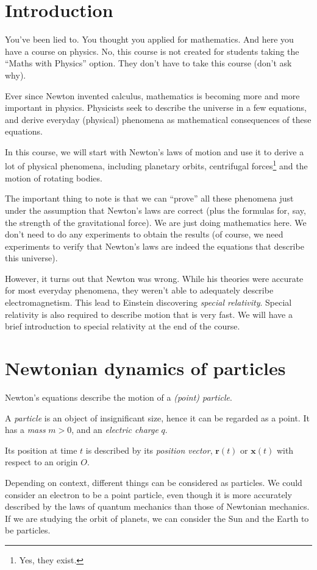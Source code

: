 \documentclass[a4paper]{article}
\begin{document}
\tableofcontents
\setcounter{section}{-1}
\section{Introduction}
You've been lied to. You thought you applied for mathematics. And here you have a course on physics. No, this course is not created for students taking the ``Maths with Physics'' option. They don't have to take this course (don't ask why).

Ever since Newton invented calculus, mathematics is becoming more and more important in physics. Physicists seek to describe the universe in a few equations, and derive everyday (physical) phenomena as mathematical consequences of these equations.

In this course, we will start with Newton's laws of motion and use it to derive a lot of physical phenomena, including planetary orbits, centrifugal forces\footnote{Yes, they exist.} and the motion of rotating bodies.

The important thing to note is that we can ``prove'' all these phenomena just under the assumption that Newton's laws are correct (plus the formulas for, say, the strength of the gravitational force). We are just doing mathematics here. We don't need to do any experiments to obtain the results (of course, we need experiments to verify that Newton's laws are indeed the equations that describe this universe).

However, it turns out that Newton was wrong. While his theories were accurate for most everyday phenomena, they weren't able to adequately describe electromagnetism. This lead to Einstein discovering \emph{special relativity}. Special relativity is also required to describe motion that is very fast. We will have a brief introduction to special relativity at the end of the course.

\section{Newtonian dynamics of particles}
Newton's equations describe the motion of a \emph{(point) particle}.
\begin{defi}[Particle]
  A \emph{particle} is an object of insignificant size, hence it can be regarded as a point. It has a \emph{mass} $m > 0$, and an \emph{electric charge} $q$.

  Its position at time $t$ is described by its \emph{position vector}, $\mathbf{r}(t)$ or $\mathbf{x}(t)$ with respect to an origin $O$.
\end{defi}
Depending on context, different things can be considered as particles. We could consider an electron to be a point particle, even though it is more accurately described by the laws of quantum mechanics than those of Newtonian mechanics. If we are studying the orbit of planets, we can consider the Sun and the Earth to be particles.
\end{document}
